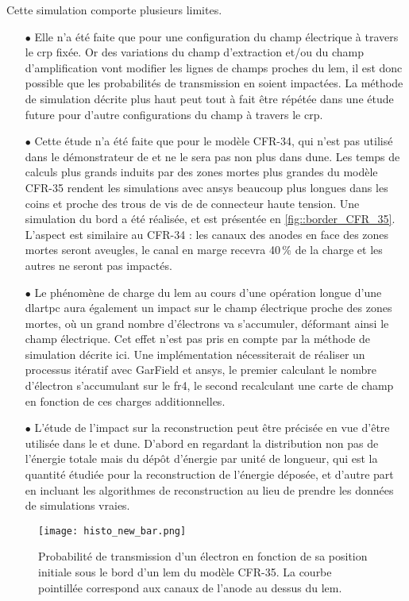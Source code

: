       Cette simulation comporte plusieurs limites.
      \begin{itemize}
        \item[$\bullet$] Elle n'a été faite que pour une configuration du champ électrique à travers le \gls{crp} fixée. Or des variations du champ d'extraction et/ou du champ d'amplification vont modifier les lignes de champs proches du \gls{lem}, il est donc possible que les probabilités de transmission en soient impactées. La méthode de simulation décrite plus haut peut tout à fait être répétée dans une étude future pour d'autre configurations du champ à travers le \gls{crp}.
        \item[$\bullet$] Cette étude n'a été faite que pour le modèle CFR-34, qui n'est pas utilisé dans le démonstrateur de \SSS{} et ne le sera pas non plus dans \gls{dune}. Les temps de calculs plus grands induits par des zones mortes plus grandes du modèle CFR-35 rendent les simulations avec \gls{ansys} beaucoup plus longues dans les coins et proche des trous de vis de de connecteur haute tension. Une simulation du bord a été réalisée, et est présentée en \autoref{fig::border_CFR_35}. L'aspect est similaire au CFR-34 : les canaux des anodes en face des zones mortes seront aveugles, le canal en marge recevra 40\,\% de la charge et les autres ne seront pas impactés.
        \item[$\bullet$] Le phénomène de charge du \gls{lem} au cours d'une opération longue d'une \gls{dlartpc} aura également un impact sur le champ électrique proche des zones mortes, où un grand nombre d'électrons va s'accumuler, déformant ainsi le champ électrique. Cet effet n'est pas pris en compte par la méthode de simulation décrite ici. Une implémentation nécessiterait de réaliser un processus itératif avec GarField et \gls{ansys}, le premier calculant le nombre d'électron s'accumulant sur le \gls{fr4}, le second recalculant une carte de champ en fonction de ces charges additionnelles.
        \item[$\bullet$] L'étude de l'impact sur la reconstruction peut être précisée en vue d'être utilisée dans le \SSS{} et \gls{dune}. D'abord en regardant la distribution non pas de l'énergie totale mais du dépôt d'énergie par unité de longueur, qui est la quantité étudiée pour la reconstruction de l'énergie déposée, et d'autre part en incluant les algorithmes de reconstruction au lieu de prendre les données de simulations vraies.
      \end{itemize}
      
      \begin{figure}[!htb]
        \centering
        \texttt{[image: histo\_new\_bar.png]}
        \caption[Probabilité de transmission d'un électron en fonction de sa position initiale sous le bord d'un LEM du modèle CFR-35]{\label{fig::border_CFR_35}Probabilité de transmission d'un électron en fonction de sa position initiale sous le bord d'un \gls{lem} du modèle CFR-35. La courbe pointillée correspond aux canaux de l'anode au dessus du \gls{lem}.}
      \end{figure}
        
